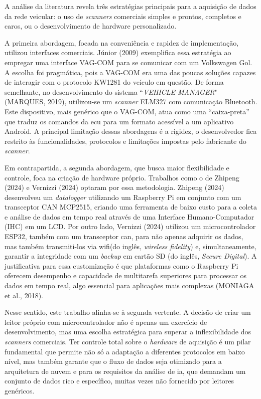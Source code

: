 \documentclass[a4paper, 12pt]{article}
\begin{document}
A análise da literatura revela três estratégias principais para a aquisição de dados da rede veicular: o uso de \textit{scanners} comerciais simples e prontos, completos e caros, ou o desenvolvimento de hardware personalizado.

A primeira abordagem, focada na conveniência e rapidez de implementação, utilizou interfaces comerciais. Júnior (2009) exemplifica essa estratégia ao empregar uma interface {VAG-COM} para se comunicar com um Volkswagen Gol. A escolha foi pragmática, pois a VAG-COM era uma das poucas soluções capazes de interagir com o protocolo {KW1281} do veículo em questão. De forma semelhante, no desenvolvimento do sistema ``\textit{VEHICLE-MANAGER}"  (MARQUES, 2019), utilizou-se um \textit{scanner} {ELM327} com comunicação Bluetooth. Este dispositivo, mais genérico que o VAG-COM, atua como uma ``caixa-preta'' que traduz os comandos da \acrshort{ecu} para um formato acessível a um aplicativo Android. A principal limitação dessas abordagens é a rigidez, o desenvolvedor fica restrito às funcionalidades, protocolos e limitações impostas pelo fabricante do \textit{scanner}.

Em contrapartida, a segunda abordagem, que busca maior flexibilidade e controle, foca na criação de hardware próprio. Trabalhos como o de Zhipeng (2024) e Vernizzi (2024) optaram por essa metodologia. Zhipeng (2024) desenvolveu um \textit{datalogger} utilizando um {Raspberry Pi} em conjunto com um transceptor {CAN MCP2515}, criando uma ferramenta de baixo custo para a coleta e análise de dados em tempo real através de uma Interface Humano-Computador (IHC) em um LCD. Por outro lado, Vernizzi (2024) utilizou um microcontrolador {ESP32}, também com um transceptor \acrshort{can}, para não apenas adquirir os dados, mas também transmiti-los via \acrshort{wifi}(do inglês, \textit{wireless fidelity}) e, simultaneamente, garantir a integridade com um \textit{backup} em cartão SD (do inglês, \textit{Secure Digital}). A justificativa para essa customização é que plataformas como o Raspberry Pi oferecem desempenho e capacidade de multitarefa superiores para processar os dados em tempo real, algo essencial para aplicações mais complexas (MONIAGA et al., 2018).

Nesse sentido, este trabalho alinha-se à segunda vertente. A decisão de criar um leitor próprio com microcontrolador não é apenas um exercício de desenvolvimento, mas uma escolha estratégica para superar a inflexibilidade dos \textit{scanners} comerciais. Ter controle total sobre o \textit{hardware} de aquisição é um pilar fundamental que permite não só a adaptação a diferentes protocolos em baixo nível, mas também garante que o fluxo de dados seja otimizado para a arquitetura de nuvem e para os requisitos da análise de \acrshort{ia}, que demandam um conjunto de dados rico e específico, muitas vezes não fornecido por leitores genéricos.
\end{document}
